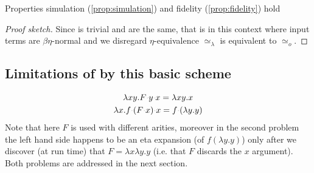 \documentclass[sigconf,natbib=false,review]{acmart}
\newcommand{\appsep}{\ensuremath{\textcolor{lightgray}{\cdot}}}
\newcommand{\UnifRel}{\ensuremath{\simeq}}
\newcommand{\Uo}{\ensuremath{\UnifRel_o}\xspace}
\newcommand{\Ue}{\ensuremath{\UnifRel_\lambda}\xspace}
\begin{document}
\begin{lemma} Properties simulation (\ref{prop:simulation}) and
fidelity (\ref{prop:fidelity}) hold
\end{lemma}
\begin{proof}[Proof sketch]
Since  is trivial \fstep and \hstep are the same, that is
in this
context where input terms are $\beta\eta$-normal and we disregard $\eta$-equivalence
\Ue is equivalent to \Uo.
\end{proof}

\subsection{Limitations of by this basic scheme}
\label{sec:basic-comp-limitations}

\begin{gather}
\lambda x y.F \appsep y \appsep x = \lambda x y.x \label{eq:unif-eta1}\\
\lambda x. f \appsep (F \appsep x) \appsep x = f \appsep (\lambda y.y) \label{eq:unif-eta2}
\end{gather}
Note that here $F$ is used with different arities, moreover
in the second problem the left hand side happens to be an
eta expansion (of $f (\lambda y.y)$) only after we discover (at run time)
that $F = \lambda x\lambda y.y$ (i.e. that $F$ discards the $x$ argument).
Both problems are addressed in the next section.
  




\end{document}
